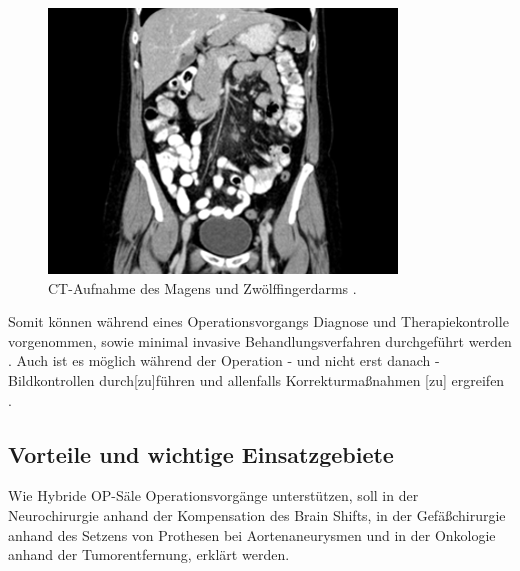 \begin{figure}[!htb]
	\includegraphics[width=\linewidth]{Content/Pictures/mrtct.png}
	\caption{CT-Aufnahme des Magens und Zwölffingerdarms \cite{CTBild}.}
	\label{fig:mrtct}
	\endminipage
\end{figure}

Somit können während eines Operationsvorgangs Diagnose und Therapiekontrolle vorgenommen, sowie minimal invasive Behandlungsverfahren durchgeführt werden \cite{SHG-Kliniken}. Auch ist es möglich \glqq während der Operation - und nicht erst danach - Bildkontrollen durch[zu]führen und allenfalls Korrekturmaßnahmen [zu] ergreifen\grqq{} \cite{OPderZukunft}. 

\subsection{Vorteile und wichtige Einsatzgebiete}

Wie Hybride OP-Säle Operationsvorgänge unterstützen, soll in der Neurochirurgie anhand der Kompensation des Brain Shifts, in der Gefäßchirurgie anhand des Setzens von Prothesen bei Aortenaneurysmen und in der Onkologie anhand der Tumorentfernung, erklärt werden.

